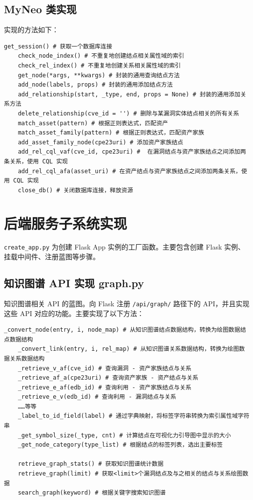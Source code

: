 \documentclass[a4paper,AutoFakeBold,oneside,12pt]{book}
\begin{document}
\subsection{MyNeo 类实现}

实现的方法如下：
\begin{lstlisting}[style=lgeneral]
	get_session() # 获取一个数据库连接
	check_node_index() # 不重复地创建结点相关属性域的索引
	check_rel_index() # 不重复地创建关系相关属性域的索引
	get_node(*args, **kwargs) # 封装的通用查询结点方法
	add_node(labels, props) # 封装的通用添加结点方法
	add_relationship(start, _type, end, props = None) # 封装的通用添加关系方法
	delete_relationship(cve_id = '') # 删除与某漏洞实体结点相关的所有关系
	match_asset(pattern) # 根据正则表达式，匹配资产
	match_asset_family(pattern) # 根据正则表达式，匹配资产家族
	add_asset_family_node(cpe23uri) # 添加资产家族结点
	add_rel_cql_vaf(cve_id, cpe23uri) #  在漏洞结点与资产家族结点之间添加两条关系，使用 CQL 实现
	add_rel_cql_afa(asset_uri) # 在资产结点与资产家族结点之间添加两条关系，使用 CQL 实现
	close_db() # 关闭数据库连接，释放资源
\end{lstlisting}

\section{后端服务子系统实现}

\lstinline|create_app.py| 为创建 Flask App 实例的工厂函数\cite{factory_method_design_pattern}。主要包含创建 Flask 实例、挂载中间件、注册蓝图等步骤。

\subsection{知识图谱 API 实现 graph.py}

知识图谱相关 API 的蓝图。向 Flask 注册 \lstinline|/api/graph/| 路径下的 API，并且实现这些 API 对应的功能。主要实现了以下方法：
\begin{lstlisting}[style=lgeneral]
	_convert_node(entry, i, node_map) # 从知识图谱结点数据结构，转换为绘图数据结点数据结构
	_convert_link(entry, i, rel_map) # 从知识图谱关系数据结构，转换为绘图数据关系数据结构
	_retrieve_v_af(cve_id) # 查询漏洞 - 资产家族结点与关系
	_retrieve_af_a(cpe23uri) # 查询资产家族 - 资产结点与关系
	_retrieve_e_af(edb_id) # 查询利用 - 资产家族结点与关系
	_retrieve_e_v(edb_id) # 查询利用 - 漏洞结点与关系
	……等等
	_label_to_id_field(label) # 通过字典映射，将标签字符串转换为索引属性域字符串
	_get_symbol_size(_type, cnt) # 计算结点在可视化力引导图中显示的大小
	_get_node_category(type_list) # 根据结点的标签列表，选出主要标签

	retrieve_graph_stats() # 获取知识图谱统计数据
	retrieve_graph(limit) # 获取<limit>个漏洞结点及与之相关的结点与关系绘图数据
	search_graph(keyword) # 根据关键字搜索知识图谱
\end{lstlisting}
\end{document}
